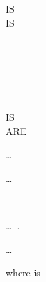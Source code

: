 \begin{syntax}
   \reportname

  \begin{0-1}
    IS  \\

      IS
    \begin{1=}
      \identifier \\
      \literal
    \end{1=} \\

    \begin{1=}
       \\
    \end{1=}
    \begin{0-1}
      IS \\
      ARE
    \end{0-1}
    \begin{1=}
      \begin{1=}
        \identifier
      \end{1=}\ldots \\

      \begin{0-1}
        \identifier
      \end{0-1}\ldots \\
    \end{1=} \\

  \end{0-1}\ldots\ {}.\newline

  \begin{1=}
  \end{1=}\ldots
\end{syntax}

where  is

